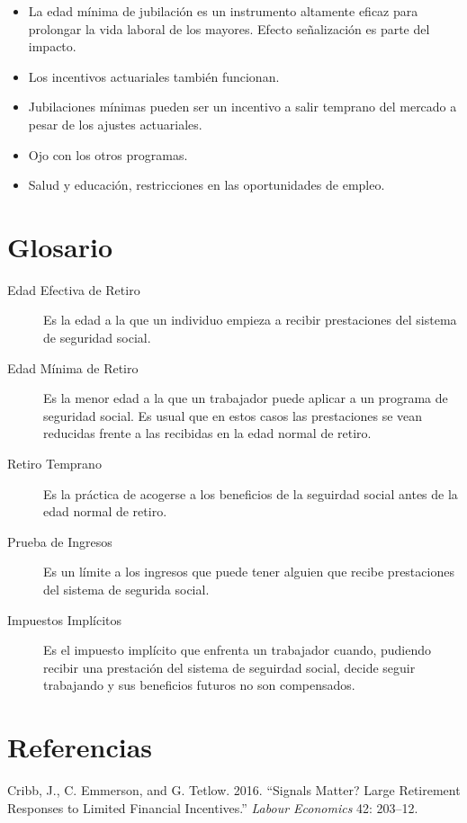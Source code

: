 \documentclass[]{article}
\providecommand{\tightlist}{%
  \setlength{\itemsep}{0pt}\setlength{\parskip}{0pt}}
\begin{document}
\begin{itemize}
\tightlist
\item
  La edad mínima de jubilación es un instrumento altamente eficaz para
  prolongar la vida laboral de los mayores. Efecto señalización es parte
  del impacto.
\item
  Los incentivos actuariales también funcionan.
\item
  Jubilaciones mínimas pueden ser un incentivo a salir temprano del
  mercado a pesar de los ajustes actuariales.
\item
  Ojo con los otros programas.
\item
  Salud y educación, restricciones en las oportunidades de empleo.
\end{itemize}

\hypertarget{glosario}{%
\section{Glosario}\label{glosario}}

\begin{description}
\item[Edad Efectiva de Retiro]
Es la edad a la que un individuo empieza a recibir prestaciones del
sistema de seguridad social.
\item[Edad Mínima de Retiro]
Es la menor edad a la que un trabajador puede aplicar a un programa de
seguridad social. Es usual que en estos casos las prestaciones se vean
reducidas frente a las recibidas en la edad normal de retiro.
\item[Retiro Temprano]
Es la práctica de acogerse a los beneficios de la seguirdad social antes
de la edad normal de retiro.
\item[Prueba de Ingresos]
Es un límite a los ingresos que puede tener alguien que recibe
prestaciones del sistema de segurida social.
\item[Impuestos Implícitos]
Es el impuesto implícito que enfrenta un trabajador cuando, pudiendo
recibir una prestación del sistema de seguirdad social, decide seguir
trabajando y sus beneficios futuros no son compensados.
\end{description}

\hypertarget{referencias}{%
\section*{Referencias}\label{referencias}}

\hypertarget{refs}{}
\leavevmode\hypertarget{ref-cribb16}{}%
Cribb, J., C. Emmerson, and G. Tetlow. 2016. ``Signals Matter? Large
Retirement Responses to Limited Financial Incentives.'' \emph{Labour
Economics} 42: 203--12.
\end{document}
